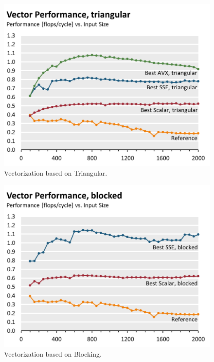 \begin{figure}[htb]\centering
  \includegraphics[width=\linewidth]{plot_data/triangular_vector_performance.png}
  \caption{Vectorization based on Triangular.}
  \label{fig:perf-triangular}
\end{figure}


\begin{figure}[htb]\centering
  \includegraphics[width=\linewidth]{plot_data/blocked_vector_performance.png}
  \caption{Vectorization based on Blocking.}
  \label{fig:perf-blocked}
\end{figure}


